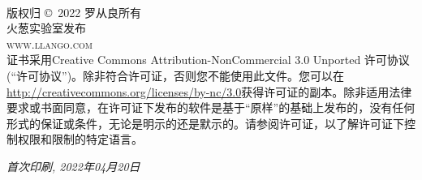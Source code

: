 
\newpage

~\vfill
\vspace{12ex}
\thispagestyle{empty}

\noindent 版权归 \copyright\ 2022 罗从良所有\\ %

\noindent \textsc{火葱实验室发布}\\ %

\noindent \textsc{www.llango.com}\\ %

\noindent 证书采用Creative Commons Attribution-NonCommercial 3.0 Unported 许可协议(“许可协议”)。除非符合许可证，否则您不能使用此文件。您可以在\url{http://creativecommons.org/licenses/by-nc/3.0}获得许可证的副本。除非适用法律要求或书面同意，在许可证下发布的软件是基于“原样”的基础上发布的，没有任何形式的保证或条件，无论是明示的还是默示的。请参阅许可证，以了解许可证下控制权限和限制的特定语言。%

\noindent \textit{首次印刷, 2022年04月20日} %
